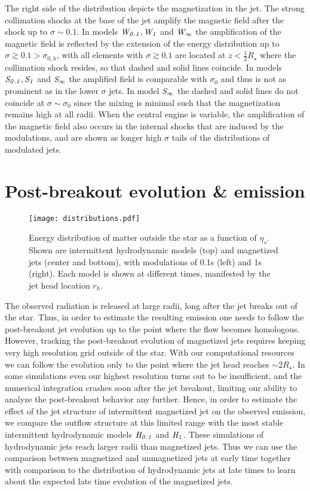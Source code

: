 \documentclass[fleqn,usenatbib]{mnras}
\newcommand{\Ha}{{\it H_{0.1}}}
\newcommand{\Hb}{{\it H_{1}}}
\newcommand{\Wa}{{\it W_{0.1}}}
\newcommand{\Wb}{{\it W_{1}}}
\newcommand{\Sa}{{\it S_{0.1}}}
\newcommand{\Sb}{{\it S_{1}}}
\newcommand{\Wc}{{\it W_{\infty}}}
\newcommand{\Sc}{{\it S_{\infty}}}
\newcommand{\sigh}{{\sigma_{0,h}}}
\begin{document}
	The right side of the distribution depicts the magnetization in the jet.
	The strong collimation shocks at the base of the jet amplify the magnetic field after the shock up to $ \sigma \sim 0.1 $.
	In models $ \Wa, \Wb $ and $ \Wc $ the amplification of the magnetic field is reflected by the extension of the energy distribution up to $ \sigma \gtrsim 0.1 > \sigh $, with all elements with $ \sigma \gtrsim 0.1 $ are located at $ z < \frac{1}{2}R_\star $ where the collimation shock resides, so that dashed and solid lines coincide.
	In models $ \Sa, \Sb $ and $ \Sc $ the amplified field is comparable with $ \sigma_0 $ and thus is not as prominent as in the lower $ \sigma $ jets. In model $ \Sc $ the dashed and solid lines do not coincide at $ \sigma \sim \sigma_0 $ since the mixing is minimal such that the magnetization remains high at all radii.
    When the central engine is variable, the amplification of the magnetic field also occurs in the internal shocks that are induced by the modulations, and are shown as longer high $ \sigma $ tails of the distributions of modulated jets.

	\section{Post-breakout evolution \& emission}
	\label{sec:post}
	
	\begin{figure*}
		\centering
		\texttt{[image: distributions.pdf]}
		\caption[Distributions]{
			Energy distribution of matter outside the star as a function of $ \eta_s $. Shown are intermittent hydrodynamic models (top) and magnetized jets (center and bottom), with modulations of 0.1s (left) and 1s (right). Each model is shown at different times, manifested by the jet head location $ r_h $.
		}
		\label{fig:distributions}
	\end{figure*}
	
	The observed radiation is released at large radii, long after the jet breaks out of the star. Thus, in order to estimate the resulting emission one needs to follow the post-breakout jet evolution
	up to the point where the flow becomes homologous. However, tracking the post-breakout evolution of magnetized jets requires keeping very high resolution grid outside of the star. With our computational resources we can follow the evolution only to the point where the jet head reaches $ \sim 2R_\star $. In some simulations even our highest resolution turns out to be insufficient, and the numerical integration crashes soon after the jet breakout, limiting our ability to analyze the post-breakout behavior any further. Hence, in order to estimate the effect of the jet structure of intermittent magnetized jet on the observed emission, we compare the outflow structure at this limited range with the most stable intermittent hydrodynamic models $ \Ha $ and $ \Hb $. These simulations of hydrodynamic jets reach larger radii than magnetized jets. Thus we can use the comparison between magnetized and unmagnetized jets at early time together with comparison to the distribution of hydrodynamic jets at late times to learn about the expected late time evolution of the magnetized jets.
	
\end{document}
